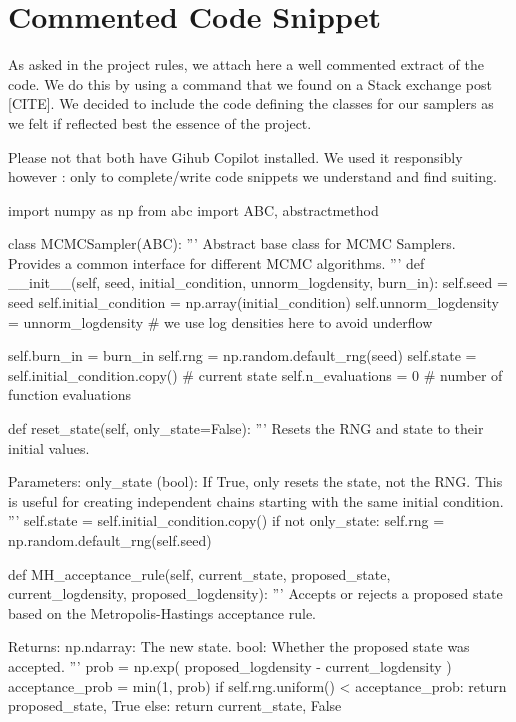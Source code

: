 \documentclass[a4paper, 12pt,oneside]{article}
\begin{document}
		\section{Commented Code Snippet}\label{appendix:commented-code-snippet}
		As asked in the project rules, we attach here a well commented extract of the code. We do this by using a command that we found on a Stack exchange post [CITE]. We decided to include the code defining the classes for our samplers as we felt if reflected best the essence of the project.

		Please not that both have Gihub Copilot installed. We used it responsibly however : only to complete/write code snippets we understand and find suiting.
		\begin{python}
		import numpy as np
		from abc import ABC, abstractmethod

		class MCMCSampler(ABC):
			'''
			Abstract base class for MCMC Samplers. Provides a common interface for different MCMC algorithms.
			'''
			def __init__(self, seed, initial_condition, unnorm_logdensity, burn_in):
				self.seed = seed
				self.initial_condition = np.array(initial_condition)
				self.unnorm_logdensity = unnorm_logdensity
				# we use log densities here to avoid underflow
				
				self.burn_in = burn_in
				self.rng = np.random.default_rng(seed)
				self.state = self.initial_condition.copy() # current state
				self.n_evaluations = 0 # number of function evaluations
			
			def reset_state(self, only_state=False):
				'''
				Resets the RNG and state to their initial values.

				Parameters:
				only_state (bool): If True, only resets the state, not the RNG. This is useful for creating independent chains starting with the same initial condition.
				'''
				self.state = self.initial_condition.copy()
				if not only_state:
					self.rng = np.random.default_rng(self.seed)
			
			def MH_acceptance_rule(self, current_state, proposed_state, current_logdensity, proposed_logdensity):
				'''
				Accepts or rejects a proposed state based on the Metropolis-Hastings acceptance rule.

				Returns:
				np.ndarray: The new state.
				bool: Whether the proposed state was accepted.
				'''
				prob = np.exp( proposed_logdensity - current_logdensity )
				acceptance_prob = min(1, prob)
				if self.rng.uniform() < acceptance_prob:
					return proposed_state, True
				else:
					return current_state, False


\end{python}
\end{document}
